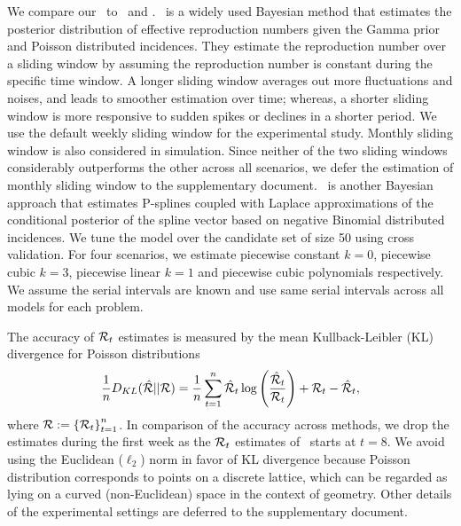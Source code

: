 We compare our \RtEstim\ to \EpiEstim\ and \EpiLPS. \EpiEstim\ is a widely used Bayesian method that estimates the posterior distribution of effective reproduction numbers given the Gamma prior and Poisson distributed incidences. They estimate the reproduction number over a sliding window by assuming the reproduction number is constant during the specific time window. A longer sliding window averages out more fluctuations and noises, and leads to smoother estimation over time; whereas, a shorter sliding window is more responsive to sudden spikes or declines in a shorter period. We use the default weekly sliding window for the experimental study. Monthly sliding window is also considered in simulation. Since neither of the two sliding windows considerably outperforms the other across all scenarios, we defer the estimation of monthly sliding window to the supplementary document. 
\EpiLPS\ is another Bayesian approach that estimates P-splines coupled with Laplace approximations of the conditional posterior of the spline vector based on negative Binomial distributed incidences. 
We tune the model over the candidate set of size 50 using cross validation. For four scenarios, we estimate piecewise constant $k=0$, piecewise cubic $k=3$, piecewise linear $k=1$ and piecewise cubic polynomials respectively. 
We assume the serial intervals are known and use same serial intervals across all models for each problem. 

The accuracy of $\mathcal{R}_t$ estimates is measured by the mean Kullback-Leibler (KL) divergence for Poisson distributions  $$\frac{1}{n} D_{KL}(\hat{\mathcal{R}}|| \mathcal{R}) = \frac{1}{n}\sum_{t=1}^n \hat{\mathcal{R}}_t \log\left(\frac{\hat{\mathcal{R}}_t}{\mathcal{R}_t}\right) + {\mathcal{R}}_t - \hat{\mathcal{R}}_t,$$ 
where $\mathcal{R} := \left\{ \mathcal{R}_t \right\}_{t=1}^n$. %
In comparison of the accuracy across methods, we drop the estimates during the first week as the $\mathcal{R}_t$ estimates of \EpiEstim\ starts at $t=8$. We avoid using the Euclidean ($\ell_2$) norm in favor of KL divergence because Poisson distribution corresponds to points on a discrete lattice, which can be regarded as lying on a curved (non-Euclidean) space in the context of geometry. 
Other details of the experimental settings are deferred to the supplementary document. 

